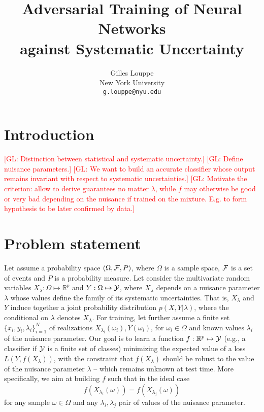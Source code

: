\documentclass{article}
\title{Adversarial Training of Neural Networks\\
against Systematic Uncertainty}
\author{
  Gilles Louppe \\
  New York University\\
  \texttt{g.louppe@nyu.edu} \\
}
\newcommand{\glnote}[1]{\textcolor{red}{[GL: #1]}}
\theoremstyle{plain}
\begin{document}

\maketitle

\begin{abstract}
\end{abstract}

\section{Introduction}

\glnote{Distinction between statistical and systematic uncertainty.}
\glnote{Define nuisance parameters.}
\glnote{We want to build an accurate classifier whose output remains invariant with
respect to systematic uncertainties.}
\glnote{Motivate the criterion: allow to derive guarantees no matter $\lambda$,
while $f$ may otherwise be good or very bad depending on the nuisance if trained
on the mixture. E.g. to form hypothesis to be later confirmed by data.}



\section{Problem statement}
\label{sec:problem}

Let assume a probability space $(\Omega, {\cal F}, P)$, where $\Omega$ is a
sample space, ${\cal F}$ is a set of events and $P$ is a probability measure.
Let consider the multivariate random variables $X_\lambda: \Omega \mapsto
\mathbb{R}^p$ and $Y: \Omega \mapsto {\cal Y}$, where $X_\lambda$ depends on a
nuisance parameter $\lambda$ whose values define the family of its systematic uncertainties.
That is, $X_\lambda$ and $Y$ induce together
a joint probability distribution $p(X,Y|\lambda)$, where the
conditional on $\lambda$ denotes $X_\lambda$. For training, let further assume a
finite set $\{ x_i, y_i, \lambda_i \}_{i=1}^N$ of realizations
$X_{\lambda_i}(\omega_i), Y(\omega_i)$, for $\omega_i \in \Omega$ and known
values $\lambda_i$ of the nuisance parameter. Our goal is to learn a function $f :
\mathbb{R}^p \mapsto {\cal Y}$ (e.g., a classifier if ${\cal Y}$ is a finite set
of classes) minimizing the expected value of a loss $L(Y, f(X_{\lambda}))$, with
the constraint that $f(X_\lambda)$ should be robust to the value of the nuisance
parameter $\lambda$ -- which remains unknown at test time. More specifically, we
aim at building $f$ such that in the ideal case
\begin{equation}\label{eqn:criterion-true}
f(X_{\lambda_i}(\omega)) = f(X_{\lambda_j}(\omega))
\end{equation} for any
sample $\omega \in \Omega$ and any $\lambda_i, \lambda_j$ pair of values of the
nuisance parameter.
\end{document}
